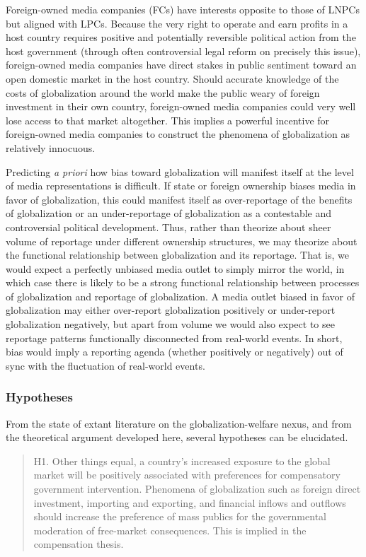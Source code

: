 \documentclass[12pt]{article}
\begin{document}
Foreign-owned media companies (FCs) have interests opposite to those of LNPCs but aligned with LPCs. Because the very right to operate and earn profits in a host country requires positive and potentially reversible political action from the host government (through often controversial legal reform on precisely this issue), foreign-owned media companies have direct stakes in public sentiment toward an open domestic market in the host country. Should accurate knowledge of the costs of globalization around the world make the public weary of foreign investment in their own country, foreign-owned media companies could very well lose access to that market altogether. This implies a powerful incentive for foreign-owned media companies to construct the phenomena of globalization as relatively innocuous. 

Predicting \emph{a priori} how bias toward globalization will manifest itself at the level of media representations is difficult. If state or foreign ownership biases media in favor of globalization, this could manifest itself as over-reportage of the benefits of globalization or an under-reportage of globalization as a contestable and controversial political development. Thus, rather than theorize about sheer volume of reportage under different ownership structures, we may theorize about the functional relationship between globalization and its reportage. That is, we would expect a perfectly unbiased media outlet to simply mirror the world, in which case there is likely to be a strong functional relationship between processes of globalization and reportage of globalization. A media outlet biased in favor of globalization may either over-report globalization positively or under-report globalization negatively, but apart from volume we would also expect to see reportage patterns functionally disconnected from real-world events. In short, bias would imply a reporting agenda (whether positively or negatively) out of sync with the fluctuation of real-world events.

\subsubsection{Hypotheses}
From the state of extant literature on the globalization-welfare nexus, and from the theoretical argument developed here, several hypotheses can be elucidated.

\singlespacing
\begin{quote}
H1. Other things equal, a country's increased exposure to the global market will be positively associated with preferences for compensatory government intervention. Phenomena of globalization such as foreign direct investment, importing and exporting, and financial inflows and outflows should increase the preference of mass publics for the governmental moderation of free-market consequences. This is implied in the compensation thesis.
\end{quote}
\doublespacing
\end{document}
